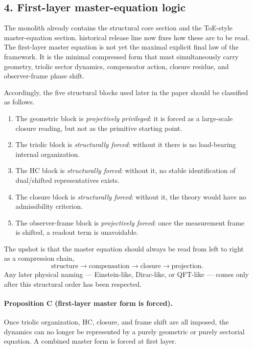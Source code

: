 \documentclass[12pt,a4paper]{article}
\DeclareRobustCommand{\QSCver}[1]{archival stage}
\renewcommand{\QSCver}[1]{historical release line}
\begin{document}
\subsection*{4. First-layer master-equation logic}
The monolith already contains the structural core section and the ToE-style
master-equation section. \QSCver{v1.2.0} now fixes how these are to be read.
The first-layer master equation is not yet the maximal explicit final law of
the framework. It is the minimal compressed form that must simultaneously carry
geometry, triolic sector dynamics, compensator action, closure residue, and
observer-frame phase shift.

Accordingly, the five structural blocks used later in the paper should be
classified as follows.
\begin{enumerate}[leftmargin=2em]
 \item The geometric block is \emph{projectively privileged}: it is forced as a
 large-scale closure reading, but not as the primitive starting point.
 \item The triolic block is \emph{structurally forced}: without it there is no
 load-bearing internal organization.
 \item The HC block is \emph{structurally forced}: without it, no stable
 identification of dual/shifted representatives exists.
 \item The closure block is \emph{structurally forced}: without it, the theory
 would have no admissibility criterion.
 \item The observer-frame block is \emph{projectively forced}: once the
 measurement frame is shifted, a readout term is unavoidable.
\end{enumerate}

The upshot is that the master equation should always be read from left to right
as a compression chain,
\[
\text{structure} \to \text{compensation} \to \text{closure} \to \text{projection}.
\]
Any later physical naming --- Einstein-like, Dirac-like, or QFT-like --- comes
only after this structural order has been respected.

\paragraph{Proposition C (first-layer master form is forced).}
Once triolic organization, HC, closure, and frame shift are all imposed, the
dynamics can no longer be represented by a purely geometric or purely sectorial
equation. A combined master form is forced at first layer.
\end{document}
